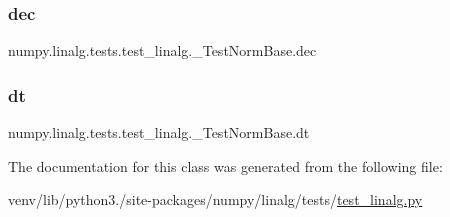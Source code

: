 \subsubsection{\texorpdfstring{dec}{dec}}
{\footnotesize\ttfamily numpy.\+linalg.\+tests.\+test\+\_\+linalg.\+\_\+\+Test\+Norm\+Base.\+dec\hspace{0.3cm}{\ttfamily [static]}}

\mbox{\label{classnumpy_1_1linalg_1_1tests_1_1test__linalg_1_1__TestNormBase_a88e7a32a9960437771c5ec53e14268c0}} 
\subsubsection{\texorpdfstring{dt}{dt}}
{\footnotesize\ttfamily numpy.\+linalg.\+tests.\+test\+\_\+linalg.\+\_\+\+Test\+Norm\+Base.\+dt\hspace{0.3cm}{\ttfamily [static]}}



The documentation for this class was generated from the following file\+:\begin{DoxyCompactItemize}
\item 
venv/lib/python3./site-\/packages/numpy/linalg/tests/\hyperlink{test__linalg_8py}{test\+\_\+linalg.\+py}\end{DoxyCompactItemize}

